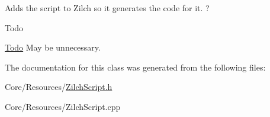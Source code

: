 Adds the script to Zilch so it generates the code for it. ? 

\begin{DoxyRefDesc}{Todo}
\item[\hyperlink{todo__todo000013}{Todo}]May be unnecessary. \end{DoxyRefDesc}


The documentation for this class was generated from the following files\-:\begin{DoxyCompactItemize}
\item 
Core/\-Resources/\hyperlink{ZilchScript_8h}{Zilch\-Script.\-h}\item 
Core/\-Resources/Zilch\-Script.\-cpp\end{DoxyCompactItemize}
